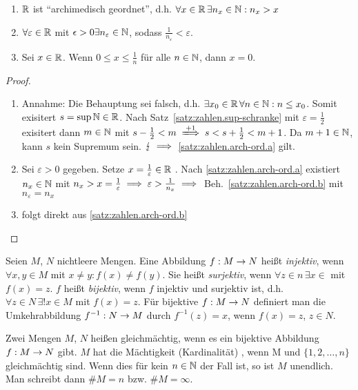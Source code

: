 \documentclass[12pt]{scrreprt}
\begin{document}
\begin{satz}\label{satz:zahlen.arch-ord}
\begin{enumerate}
\item \label{satz:zahlen.arch-ord.a}
$\mathbb{R}$ ist "`archimedisch geordnet"', d.h. $\forall x \in \mathbb{R}\, \exists n_x \in \mathbb{N} : n_x > x$
\item \label{satz:zahlen.arch-ord.b}
$\forall \varepsilon \in \mathbb{R}$ mit $\epsilon > 0 \exists n_\varepsilon \in \mathbb{N}$, sodass $\frac{1}{n_\varepsilon} < \varepsilon$.
\item \label{satz:zahlen.arch-ord.c}
Sei $x \in \mathbb{R}$. Wenn $0 \le x \le \frac{1}{n} $ für alle $ n \in \mathbb{N}$, dann $x = 0$.
\end{enumerate}
\end{satz}
\begin{proof}
\begin{enumerate}
\item Annahme: Die Behauptung sei falsch, d.h. $\exists x_0 \in \mathbb{R}\,\forall n \in \mathbb{N} : n \le x_0$.
Somit exisitert $s = \sup \mathbb{N} \in \mathbb{R}$. Nach Satz~\ref{satz:zahlen.sup-schranke} mit $\varepsilon = \frac{1}{2}$
exisitert dann $m\in \mathbb{N}$ mit $s-\frac{1}{2} < m \folgtwegen{+1} s < s+\frac{1}{2} < m +1$. Da $m+1 \in \mathbb{N}$, kann $s$ kein Supremum
sein. $\lightning \implies$ \ref{satz:zahlen.arch-ord.a} gilt.
\item Sei $\varepsilon > 0$ gegeben. Setze $x = \frac{1}{\varepsilon} \in \mathbb{R}$ . Nach \ref{satz:zahlen.arch-ord.a} existiert $n_x \in \mathbb{N}$
mit $n_x > x = \frac{1}{\varepsilon} \implies \varepsilon > \frac{1}{n_x} \implies$ Beh.~\ref{satz:zahlen.arch-ord.b} mit $n_\varepsilon = n_x$
\item folgt direkt aus \ref{satz:zahlen.arch-ord.b}
\end{enumerate}
\end{proof}

\begin{dfn*}
Seien $M$, $N$ nichtleere Mengen. Eine Abbildung $f: M \rightarrow N$ heißt \emph{injektiv}, wenn $\forall x,y \in M$ mit $x \ne y : f(x) \ne f(y)$.
Sie heißt \emph{surjektiv}, wenn $\forall z \in n\,\exists x\in $ mit $f(x)=z$.
$f$ heißt \emph{bijektiv}, wenn $f$ injektiv und surjektiv ist, d.h. $\forall z \in N\, \exists !x\in M$ mit $f(x)=z$.
Für bijektive $f: M \rightarrow N$ definiert man die Umkehrabbildung $f^{-1} : N \rightarrow M$ durch $f^{-1}(z) = x$, wenn $f(x) = z$, $z\in N$.
\end{dfn*}
\begin{dfn}\label{dfn:zahlen.maechtigigkeit}
Zwei Mengen $M$, $N$ heißen gleichmächtig, wenn es ein bijektive Abbildung $f: M \rightarrow N$ gibt. $M$ hat die Mächtigkeit
(Kardinalität) , wenn M und $\{1,2, \dotsc , n\}$ gleichmächtig sind. Wenn dies für kein $n \in \mathbb{N}$ der Fall ist,
so ist $M$ unendlich. Man schreibt dann $\#M = n$ bzw. $\#M = \infty$.
\end{dfn}
\end{document}
